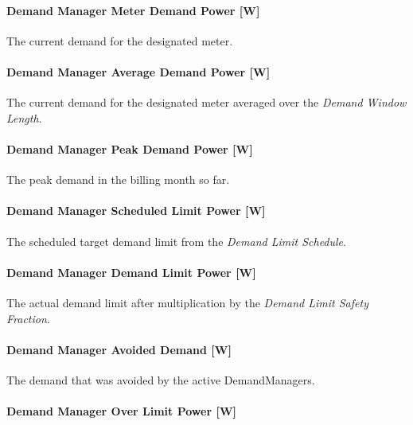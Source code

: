 \paragraph{Demand Manager Meter Demand Power {[}W{]}}\label{demand-manager-meter-demand-power-w}

The current demand for the designated meter.

\paragraph{Demand Manager Average Demand Power {[}W{]}}\label{demand-manager-average-demand-power-w}

The current demand for the designated meter averaged over the \emph{Demand Window Length}.

\paragraph{Demand Manager Peak Demand Power {[}W{]}}\label{demand-manager-peak-demand-power-w}

The peak demand in the billing month so far.

\paragraph{Demand Manager Scheduled Limit Power {[}W{]}}\label{demand-manager-scheduled-limit-power-w}

The scheduled target demand limit from the \emph{Demand Limit Schedule}.

\paragraph{Demand Manager Demand Limit Power {[}W{]}}\label{demand-manager-demand-limit-power-w}

The actual demand limit after multiplication by the \emph{Demand Limit Safety Fraction}.

\paragraph{Demand Manager Avoided Demand {[}W{]}}\label{demand-manager-avoided-demand-w}

The demand that was avoided by the active DemandManagers.

\paragraph{Demand Manager Over Limit Power {[}W{]}}\label{demand-manager-over-limit-power-w}

